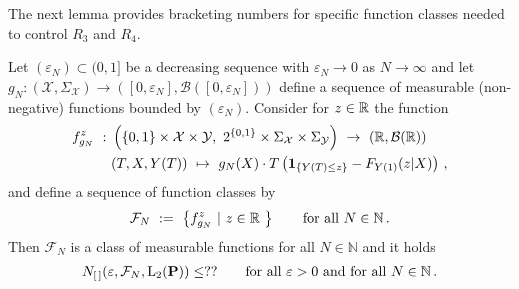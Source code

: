 The next lemma provides bracketing numbers for specific function classes needed to control $R_3$ and $R_4$.
\begin{lemma}
  Let
  $(\varepsilon_N)\subset(0,1]$ be 
  a decreasing sequence
  with
  $\varepsilon_N\to 0$ as $N\to\infty$ 
  and let
  $
  g_N
  :
  (\mathcal{X},\Sigma_\mathcal{X})\to ([0,\varepsilon_N],\mathcal{B}([0,\varepsilon_N]))
  $
  define a sequence of measurable (non-negative) functions bounded by 
  $(\varepsilon_N)$.
  Consider for $z\in\mathbb{R}$ the function
  \begin{align*}
    f_{g_N}^z
    \ 
    :
    \ 
    &
    \left( 
      \left\{ 0,1 \right\}
      \times
      \mathcal{X}
      \times
      \mathcal{Y}
      ,
      \ 
      2^{\left\{ 0,1 \right\}}
      \times
      \Sigma_\mathcal{X}
      \times
      \Sigma_\mathcal{Y}
    \right)
    \ 
    \to
    \ 
    \left( 
      \R,
      \mathcal{B}(\R)
    \right)
    \\
    &
      (T,X,Y(T))
      \ 
      \mapsto
      \ 
      g_N(X)
      \cdot
      T
      \left( 
        \mathbf{1}
        _{\left\{ Y(T)\le z \right\}}
        -
        F_{Y(1)}(z|X)
      \right)
      \,,
  \end{align*}
  and define 
  a sequence of function classes by
  \begin{gather*}
    \mathcal{F}_N
    \ 
    :=
    \ 
    \left\{ 
      f_{g_N}^z
      \ 
      |
      \ 
      z\in\R\ 
    \right\}
    \qquad
    \text{for all}
    \ 
    N\in\mathbb{N}
    \,.
  \end{gather*}
  Then $\mathcal{F}_N$ is a class of measurable functions for all
  $N\in\mathbb{N}$
  and it holds
  \begin{gather}
    N_{[\,]}(\varepsilon,\mathcal{F}_N,\mathrm{L}_2(\P))
    \le
    ??
    \qquad
    \text{for all}
    \ 
    \varepsilon>0
    \ 
    \text{and for all}
    \ 
    N\in\mathbb{N}
    \,.
  \end{gather}
\end{lemma}
